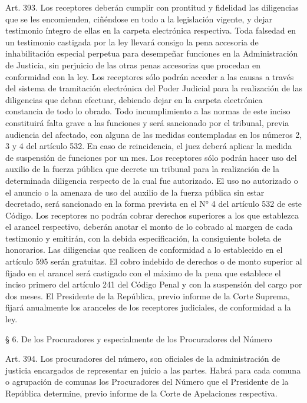     Art. 393. Los receptores deberán cumplir con prontitud y fidelidad las diligencias que se les encomienden, ciñéndose en todo a la legislación vigente, y dejar testimonio íntegro de ellas en la carpeta electrónica respectiva.
    Toda falsedad en un testimonio castigada por la ley llevará consigo la pena accesoria de inhabilitación especial perpetua para desempeñar funciones en la Administración de Justicia, sin perjuicio de las otras penas accesorias que procedan en conformidad con la ley.
    Los receptores sólo podrán acceder a las causas a través del sistema de tramitación electrónica del Poder Judicial para la realización de las diligencias que deban efectuar, debiendo dejar en la carpeta electrónica constancia de todo lo obrado. Todo incumplimiento a las normas de este inciso constituirá falta grave a las funciones y será sancionado por el tribunal, previa audiencia del afectado, con alguna de las medidas contempladas en los números 2, 3 y 4 del artículo 532. En caso de reincidencia, el juez deberá aplicar la medida de suspensión de funciones por un mes.
    Los receptores sólo podrán hacer uso del auxilio de la fuerza pública que decrete un tribunal para la realización de la determinada diligencia respecto de la cual fue autorizado. El uso no autorizado o el anuncio o la amenaza de uso del auxilio de la fuerza pública sin estar decretado, será sancionado en la forma prevista en el N° 4 del artículo 532 de este Código.
    Los receptores no podrán cobrar derechos superiores a los que establezca el arancel respectivo, deberán anotar el monto de lo cobrado al margen de cada testimonio y emitirán, con la debida especificación, la consiguiente boleta de honorarios. Las diligencias que realicen de conformidad a lo establecido en el artículo 595 serán gratuitas. El cobro indebido de derechos o de monto superior al fijado en el arancel será castigado con el máximo de la pena que establece el inciso primero del artículo 241 del Código Penal y con la suspensión del cargo por dos meses.
    El Presidente de la República, previo informe de la Corte Suprema, fijará anualmente los aranceles de los receptores judiciales, de conformidad a la ley.



    § 6. De los Procuradores y especialmente de los Procuradores del Número


    Art. 394. Los procuradores del número, son oficiales de la administración de justicia encargados de representar en juicio a las partes.
    Habrá para cada comuna o agrupación de comunas los Procuradores del Número que el Presidente de la República determine, previo informe de la Corte de Apelaciones respectiva.



